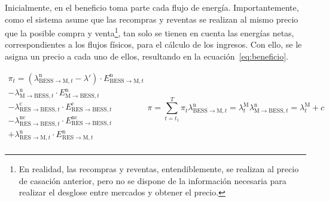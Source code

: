 Inicialmente, en el beneficio toma parte cada flujo de energía. Importantemente, como el sistema asume que las recompras y reventas se realizan al mismo precio que la posible compra y venta\footnote{En realidad, las recompras y reventas, entendiblemente, se realizan al precio de casación anterior, pero no se dispone de la información necesaria para realizar el desglose entre mercados y obtener el precio.}, tan solo se tienen en cuenta las energías netas, correspondientes a los flujos físicos, para el cálculo de los ingresos. Con ello, se le asigna un precio a cada uno de ellos, resultando en la ecuación~\ref{eq:beneficio}.

\begin{subequations}%
  \label{eq:beneficio}

  \begin{equation}
    \begin{split}
      \pi_{t}
      = \left(\lambda^{\mathrm{n}}_{\mathrm{BESS} \rightarrow \mathrm{M}, t} - \lambda'\right)
      \cdot E^{\mathrm{n}}_{\mathrm{BESS} \rightarrow \mathrm{M}, t}\\
      - \lambda^{\mathrm{n}}_{\mathrm{M} \rightarrow \mathrm{BESS}, t}
      \cdot E^{\mathrm{n}}_{\mathrm{M} \rightarrow \mathrm{BESS}, t}\\
      - \lambda^{\mathrm{c}}_{\mathrm{RES} \rightarrow \mathrm{BESS}, t}
      \cdot E^{\mathrm{c}}_{\mathrm{RES} \rightarrow \mathrm{BESS}, t}\\
      - \lambda^{\mathrm{nc}}_{\mathrm{RES} \rightarrow \mathrm{BESS}, t}
      \cdot E^{\mathrm{nc}}_{\mathrm{RES} \rightarrow \mathrm{BESS}, t}\\
      + \lambda^{\mathrm{n}}_{\mathrm{RES} \rightarrow \mathrm{M}, t}
      \cdot E^{\mathrm{n}}_{\mathrm{RES} \rightarrow \mathrm{M}, t}\\
    \end{split}
  \end{equation}

  \begin{equation}
    \pi = \sum_{t = t_{1}}^{T} \pi_{t}
  \end{equation}

  \begin{equation}
    \lambda^{\mathrm{n}}_{\mathrm{BESS} \rightarrow \mathrm{M}, t} = \lambda^{\mathrm{M}}_{t}
  \end{equation}

  \begin{equation}
    \lambda^{\mathrm{n}}_{\mathrm{M} \rightarrow \mathrm{BESS}, t} = \lambda^{\mathrm{M}}_{t} + c
  \end{equation}


\end{subequations}
